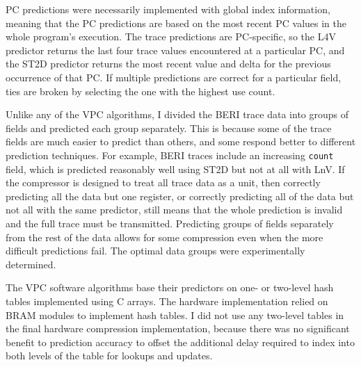 \documentclass[conference]{IEEEtran}
\begin{document}
PC predictions were necessarily implemented with global index information, meaning that the PC predictions are based on the most recent PC values in the whole program's execution. The trace predictions are PC-specific, so the L4V predictor returns the last four trace values encountered at a particular PC, and the ST2D predictor returns the most recent value and delta for the previous occurrence of that PC. If multiple predictions are correct for a particular field, ties are broken by selecting the one with the highest use count.  

Unlike any of the VPC algorithms, I divided the BERI trace data into groups of fields and predicted each group separately. This is because some of the trace fields are much easier to predict than others, and some respond better to different prediction techniques. For example, BERI traces include an increasing \texttt{count} field, which is predicted reasonably well using ST2D but not at all with LnV. If the compressor is designed to treat all trace data as a unit, then correctly predicting all the data but one register, or correctly predicting all of the data but not all with the same predictor, still means that the whole prediction is invalid and the full trace must be transmitted. Predicting groups of fields separately from the rest of the data allows for some compression even when the more difficult predictions fail. The optimal data groups were experimentally determined.

The VPC software algorithms base their predictors on one- or two-level hash tables implemented using C arrays. The hardware implementation relied on BRAM modules to implement hash tables. I did not use any two-level tables in the final hardware compression implementation, because there was no significant benefit to prediction accuracy to offset the additional delay required to index into both levels of the table for lookups and updates. 
\end{document}
